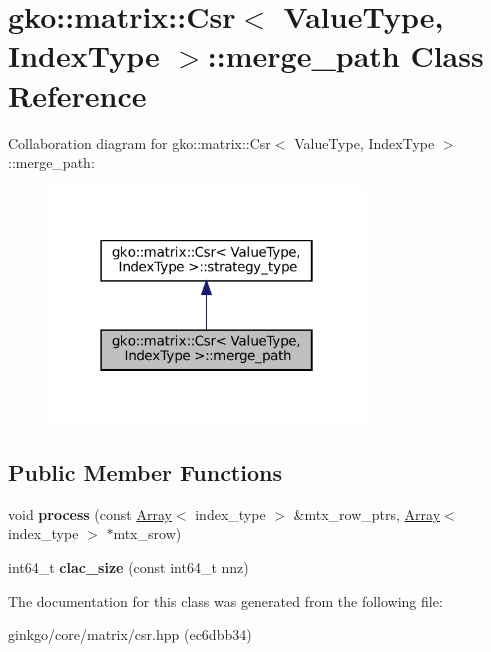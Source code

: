 \hypertarget{classgko_1_1matrix_1_1Csr_1_1merge__path}{}\section{gko\+:\+:matrix\+:\+:Csr$<$ Value\+Type, Index\+Type $>$\+:\+:merge\+\_\+path Class Reference}
\label{classgko_1_1matrix_1_1Csr_1_1merge__path}


Collaboration diagram for gko\+:\+:matrix\+:\+:Csr$<$ Value\+Type, Index\+Type $>$\+:\+:merge\+\_\+path\+:
\nopagebreak
\begin{figure}[H]
\begin{center}
\leavevmode
\includegraphics[width=238pt]{classgko_1_1matrix_1_1Csr_1_1merge__path__coll__graph}
\end{center}
\end{figure}
\subsection*{Public Member Functions}
\begin{DoxyCompactItemize}
\item 
\mbox{\label{classgko_1_1matrix_1_1Csr_1_1merge__path_a617d0a285a7851c025a56bf1ae096bc7}} 
void {\bfseries process} (const \hyperlink{classgko_1_1Array}{Array}$<$ index\+\_\+type $>$ \&mtx\+\_\+row\+\_\+ptrs, \hyperlink{classgko_1_1Array}{Array}$<$ index\+\_\+type $>$ $\ast$mtx\+\_\+srow)
\item 
\mbox{\label{classgko_1_1matrix_1_1Csr_1_1merge__path_aea68ffff5b689f63bbece61d5dc80112}} 
int64\+\_\+t {\bfseries clac\+\_\+size} (const int64\+\_\+t nnz)
\end{DoxyCompactItemize}


The documentation for this class was generated from the following file\+:\begin{DoxyCompactItemize}
\item 
ginkgo/core/matrix/csr.\+hpp (ec6dbb34)\end{DoxyCompactItemize}
